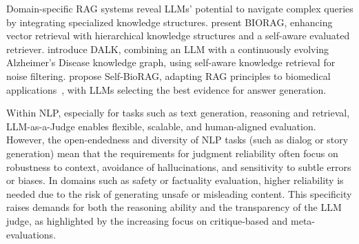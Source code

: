 \documentclass[acmsmall,screen]{acmart}
\begin{document}
Domain-specific RAG systems reveal LLMs' potential to navigate complex queries by integrating specialized knowledge structures. \citet{wang2024biorag} present BIORAG, enhancing vector retrieval with hierarchical knowledge structures and a self-aware evaluated retriever. \citet{li2024dalk} introduce DALK, combining an LLM with a continuously evolving Alzheimer's Disease knowledge graph, using self-aware knowledge retrieval for noise filtering. \citet{jeong2024improving} propose Self-BioRAG, adapting RAG principles to biomedical applications~\citet{inno_bioinformatics_liu2023bioinformatics}, with LLMs selecting the best evidence for answer generation. 

Within NLP, especially for tasks such as text generation, reasoning and retrieval, LLM-as-a-Judge enables flexible, scalable, and human-aligned evaluation. However, the open-endedness and diversity of NLP tasks (such as dialog or story generation) mean that the requirements for judgment reliability often focus on robustness to context, avoidance of hallucinations, and sensitivity to subtle errors or biases. In domains such as safety or factuality evaluation, higher reliability is needed due to the risk of generating unsafe or misleading content. This specificity raises demands for both the reasoning ability and the transparency of the LLM judge, as highlighted by the increasing focus on critique-based and meta-evaluations. 


\end{document}
